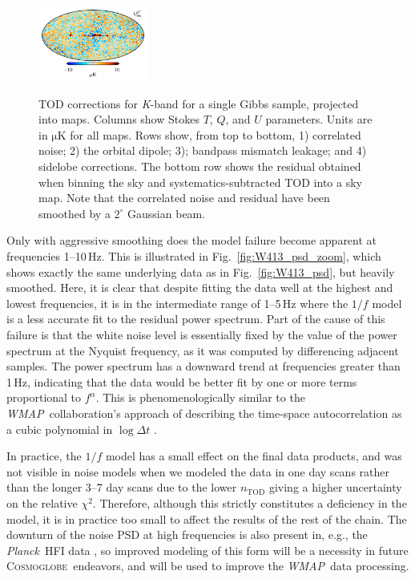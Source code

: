 \documentclass[twocolumn]{../../common/aa}
\def\WMAP{\emph{WMAP}}
\def\Planck{\emph{Planck}}
\newcommand{\cosmoglobe}{\textsc{Cosmoglobe}}
\newcommand{\K}[0]{\textit K}
\begin{document}
\begin{figure}[t]
	\includegraphics[width=0.32\textwidth]{figures/K_res_U.pdf}\\
	\caption{TOD corrections for \K-band for a single Gibbs sample, projected into maps. Columns show Stokes $T$, $Q$, and $U$ parameters. Units are in $\mathrm{\mu K}$ for all maps. Rows show, from top to bottom, 1) correlated noise; 2) the orbital dipole; 3); bandpass mismatch leakage; and 4) sidelobe corrections. The bottom row shows the residual obtained when binning the sky and systematics-subtracted TOD into a sky map. Note that the correlated noise and residual have been smoothed by a $2^\circ$ Gaussian beam.}
	\label{fig:tod_corrections}
\end{figure}

Only with aggressive smoothing does the model failure become apparent
at frequencies 1--10\,Hz. This is illustrated in
Fig.~\ref{fig:W413_psd_zoom}, which shows exactly the same underlying
data as in Fig.~\ref{fig:W413_psd}, but heavily smoothed. Here, it is
clear that despite fitting the data well at the highest and lowest
frequencies, it is in the intermediate range of 1--5\,Hz where the
$1/f$ model is a less accurate fit to the residual power
spectrum. Part of the cause of this failure is that the white noise
level is essentially fixed by the value of the power spectrum at the
Nyquist frequency, as it was computed by differencing adjacent
samples. The power spectrum has a downward trend at frequencies greater than  1\,Hz,
indicating that the data would be better fit by one or more terms
proportional to $f^\alpha$. This is phenomenologically similar to the
\WMAP\ collaboration's approach of describing the time-space
autocorrelation as a cubic polynomial in $\log\Delta t$
\citep{jarosik2007}.

In practice, the $1/f$ model has a small effect on the final data products, and
was not visible in noise models when we modeled the data in one day scans
rather than the longer 3--7 day scans due to the lower $n_\mathrm{TOD}$ giving
a higher uncertainty on the relative $\chi^2$.  Therefore, although this
strictly constitutes a deficiency in the model, it is in practice too small to
affect the results of the rest of the chain. The downturn of the noise PSD at
high frequencies is also present in, e.g., the \Planck\ HFI data
\citep[Fig.~1]{planck2014-a10}, so improved modeling of this form will be a
necessity in future \cosmoglobe\ endeavors, and will be used to improve the
\WMAP\ data processing.
\end{document}
